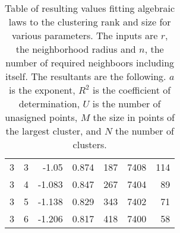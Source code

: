 \documentclass{article}
\begin{document}
\begin{table}
\begin{center}
\begin{tabular}{|r|r||r|r|r|r|r|}
  3 &  3 & -1.05 &  0.874 & 187 & 7408 & 114 \\
  3 &  4 & -1.083 &  0.847 & 267 & 7404 & 89 \\
  3 &  5 & -1.138 &  0.829 & 343 & 7402 & 71 \\
  3 &  6 & -1.206 &  0.817 & 418 & 7400 & 58 \\
\end{tabular}
\caption{Table of resulting values fitting algebraic laws to the clustering
  rank and size for various parameters. The inputs are $r$, the neighborhood 
  radius and $n$, the number of required neighboors including itself.
  The resultants are the following.
  $a$ is the exponent,
  $R^2$ is the coefficient of determination, 
  $U$ is the number of
  unasigned points, $M$ the size in points of the largest
  cluster, and $N$ the number of clusters. }
\label{tablarquad}
\end{center}
\end{table}

%




\end{document}
